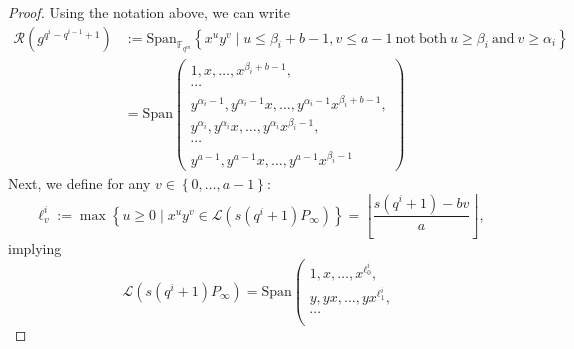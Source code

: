 \documentclass[a4paper]{amsart}
\theoremstyle{definition}
\theoremstyle{remark}
\newcommand{\calL}{\mathcal{L}}
\newcommand{\calR}{\mathcal{R}}
\newcommand{\fqm}{\mathbb{F}_{q^m}}
\newcommand{\set}[1]{\left\{#1\right\}}
\newcommand{\degab}[1]{\deg_{a,b}\left(#1\right)}
\begin{document}
\begin{proof}

Using the notation above, we can write
\begin{align*}
\calR\left(g^{q^i-q^{i-1}+1}\right) &:= \mathrm{Span}_{\fqm} \left\{x^uy^v \mid u \leq \beta_i+b-1 , v \leq a-1 \ \mathrm{not \ both} \ u \geq \beta_i \ \mathrm{and} \ v \geq \alpha_i\right\} \\
&= \mathrm{Span}    \left( \begin{array}{c}
         1,x,\dots,x^{\beta_i +b-1},   \\
         \cdots \\
         y^{\alpha_i -1},y^{\alpha_i -1}x,\dots,y^{\alpha_i -1}x^{\beta_i +b-1}, \\
          y^{\alpha_i},y^{\alpha_i}x,\dots,y^{\alpha_i}x^{\beta_i-1}, \\
         \cdots \\
         y^{a-1},y^{a-1}x,\dots,y^{a-1}x^{\beta_i-1}
    \end{array}
    \right)
\end{align*}
Next, we define for any $v \in \set{0,\dots,a-1}$:
$$\ell^i_v := \max \set{u \geq 0 \mid x^uy^v \in \calL(s(q^i+1)P_\infty)} = \left\lfloor \dfrac{s(q^i+1)-bv}{a}\right\rfloor,$$
implying
\begin{equation*}
\calL(s(q^i+1)P_\infty) = \mathrm{Span}    \left( \begin{array}{c}
         1,x,\dots,x^{\ell^i_0},   \\
         y,yx,\dots,yx^{\ell^i_1}, \\
         \cdots \\

\end{array}
\end{equation*}
\end{proof}
\end{document}
